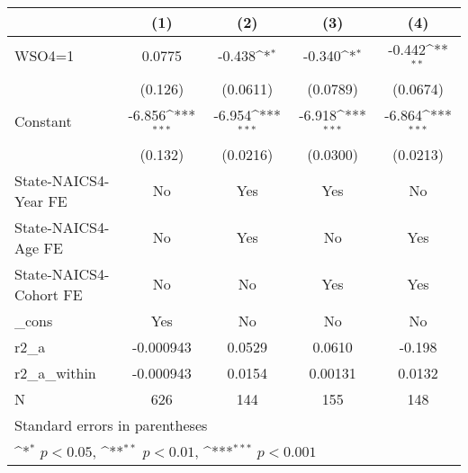 {
\def\sym#1{\ifmmode^{#1}\else\(^{#1}\)\fi}
\begin{tabular}{l*{4}{c}}
\hline\hline
                    &\multicolumn{1}{c}{(1)}         &\multicolumn{1}{c}{(2)}         &\multicolumn{1}{c}{(3)}         &\multicolumn{1}{c}{(4)}         \\
\hline
WSO4=1              &      0.0775         &      -0.438\sym{*}  &      -0.340\sym{*}  &      -0.442\sym{**} \\
                    &     (0.126)         &    (0.0611)         &    (0.0789)         &    (0.0674)         \\
[1em]
Constant            &      -6.856\sym{***}&      -6.954\sym{***}&      -6.918\sym{***}&      -6.864\sym{***}\\
                    &     (0.132)         &    (0.0216)         &    (0.0300)         &    (0.0213)         \\
[1em]
State-NAICS4-Year FE&          No         &         Yes         &         Yes         &          No         \\
[1em]
State-NAICS4-Age FE &          No         &         Yes         &          No         &         Yes         \\
[1em]
State-NAICS4-Cohort FE&          No         &          No         &         Yes         &         Yes         \\
[1em]
\_cons              &         Yes         &          No         &          No         &          No         \\
\hline
r2\_a                &   -0.000943         &      0.0529         &      0.0610         &      -0.198         \\
r2\_a\_within         &   -0.000943         &      0.0154         &     0.00131         &      0.0132         \\
N                   &         626         &         144         &         155         &         148         \\
\hline\hline
\multicolumn{5}{l}{\footnotesize Standard errors in parentheses}\\
\multicolumn{5}{l}{\footnotesize \sym{*} \(p<0.05\), \sym{**} \(p<0.01\), \sym{***} \(p<0.001\)}\\
\end{tabular}
}
